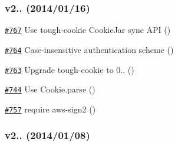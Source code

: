 \subsubsection*{v2.. (2014/01/16)}


\begin{DoxyItemize}
\item \href{https://github.com/request/request/pull/767}{\tt \#767} Use tough-\/cookie Cookie\+Jar sync A\+PI ()
\item \href{https://github.com/request/request/pull/764}{\tt \#764} Case-\/insensitive authentication scheme ()
\item \href{https://github.com/request/request/pull/763}{\tt \#763} Upgrade tough-\/cookie to 0.. ()
\item \href{https://github.com/request/request/pull/744}{\tt \#744} Use Cookie.\+parse ()
\item \href{https://github.com/request/request/pull/757}{\tt \#757} require aws-\/sign2 ()
\end{DoxyItemize}

\subsubsection*{v2.. (2014/01/08)}


